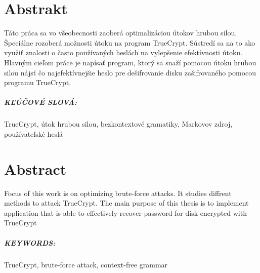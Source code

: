 \chapter*{Abstrakt}
Táto práca sa vo všeobecnosti zaoberá optimalizáciou útokov hrubou silou. Špeciálne rozoberá možnosti útoku na program TrueCrypt. Sústredí sa na to ako využiť znalosti o často používaných heslách na vylepšenie efektívnosti útoku. Hlavným cieľom práce je napísať program, ktorý sa snaží pomocou útoku hrubou silou nájsť čo najefektívnejšie heslo pre dešifrovanie disku zašifrovaného pomocou programu TrueCrypt.

\paragraph{KĽÚČOVÉ SLOVÁ:}
TrueCrypt, útok hrubou silou, bezkontextové gramatiky, Markovov zdroj, používateľské heslá

\newpage
\chapter*{Abstract}
Focus of this work is on optimizing brute-force attacks. It studies diffrent methods to attack TrueCrypt. The main purpose of this thesis is to implement application that is able to effectively recover password for disk encrypted with TrueCrypt

\paragraph{KEYWORDS:}
TrueCrypt, brute-force attack, context-free grammar